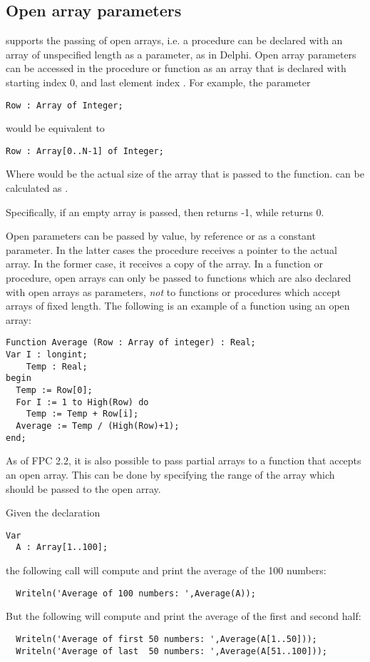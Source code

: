 \subsection{Open array parameters}
\label{se:openarray}
\fpc supports the passing of open arrays, i.e. a procedure can be declared
with an array of unspecified length as a parameter, as in Delphi.
Open array parameters can be accessed in the procedure or function as an
array that is declared with starting index 0, and last element
index .
For example, the parameter
\begin{verbatim}
Row : Array of Integer;
\end{verbatim}
would be equivalent to
\begin{verbatim}
Row : Array[0..N-1] of Integer;
\end{verbatim}
Where   would be the actual size of the array that is passed to the
function.  can be calculated as .

Specifically, if an empty array is passed, then  returns -1, 
while  returns 0.

Open parameters can be passed by value, by reference or as a constant
parameter. In the latter cases the procedure receives a pointer to the
actual array. In the former case, it receives a copy of the array.
In a function or procedure, open arrays can only be passed to functions which
are also declared with open arrays as parameters, {\em not} to functions or
procedures which accept arrays of fixed length.
The following is an example of a function using an open array:
\begin{verbatim}
Function Average (Row : Array of integer) : Real;
Var I : longint;
    Temp : Real;
begin
  Temp := Row[0];
  For I := 1 to High(Row) do
    Temp := Temp + Row[i];
  Average := Temp / (High(Row)+1);
end;
\end{verbatim}

As of FPC 2.2, it is also possible to pass partial arrays to a function that
accepts an open array. This can be done by specifying the range of the array
which should be passed to the open array.

Given the declaration
\begin{verbatim}
Var
  A : Array[1..100];
\end{verbatim}
the following call will compute and print the average of the 100 numbers:
\begin{verbatim}
  Writeln('Average of 100 numbers: ',Average(A));
\end{verbatim}
But the following will compute and print the average of the first and second
half:
\begin{verbatim}
  Writeln('Average of first 50 numbers: ',Average(A[1..50]));
  Writeln('Average of last  50 numbers: ',Average(A[51..100]));
\end{verbatim} 

